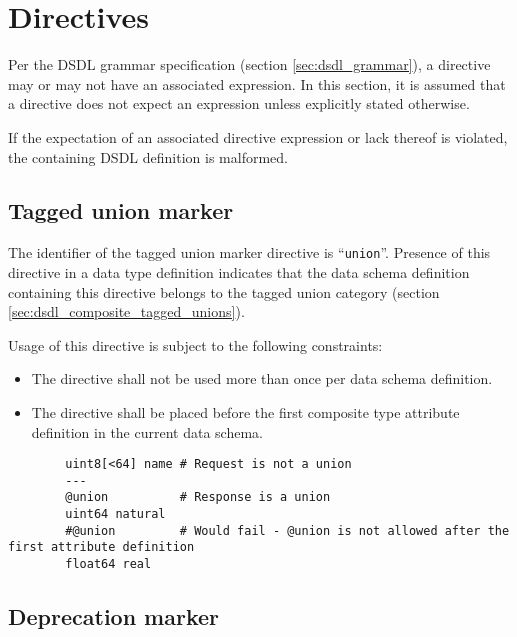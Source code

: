\section{Directives}\label{sec:dsdl_directives}

Per the DSDL grammar specification (section \ref{sec:dsdl_grammar}),
a directive may or may not have an associated expression.
In this section, it is assumed that a directive does not expect an expression unless explicitly stated otherwise.

If the expectation of an associated directive expression or lack thereof is violated,
the containing DSDL definition is malformed.

\subsection{Tagged union marker}

The identifier of the tagged union marker directive is ``\verb|union|''.
Presence of this directive in a data type definition indicates that the
data schema definition containing this directive belongs to the tagged union category
(section \ref{sec:dsdl_composite_tagged_unions}).

Usage of this directive is subject to the following constraints:
\begin{itemize}
    \item The directive shall not be used more than once per data schema definition.

    \item The directive shall be placed before the first composite type attribute definition
    in the current data schema.

\end{itemize}

\begin{remark}
    \begin{verbatim}
        uint8[<64] name # Request is not a union
        ---
        @union          # Response is a union
        uint64 natural
        #@union         # Would fail - @union is not allowed after the first attribute definition
        float64 real
    \end{verbatim}
\end{remark}

\subsection{Deprecation marker}


